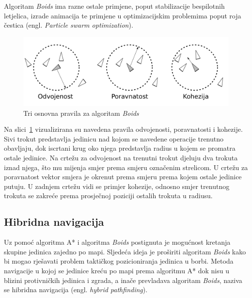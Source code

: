 \documentclass[times, utf8, zavrsni, numeric]{fer}
\begin{document}
\par Algoritam \textit{Boids} ima razne ostale primjene, poput stabilizacije bespilotnih letjelica, izrade animacija te primjene u optimizacijskim problemima poput roja čestica (engl. \textit{Particle swarm optimization}).

\begin{figure}[h]
	\centering
	\includegraphics[width=1.0\linewidth]{images/boids.pdf}
	\caption{Tri osnovna pravila za algoritam \textit{Boids}}
	\label{fig:boids}
\end{figure}

\par Na slici~\ref{fig:boids} vizualizirana su navedena pravila odvojenosti, poravnatosti i kohezije. 
Sivi trokut predstavlja jedinicu nad kojom se navedene operacije trenutno obavljaju, dok iscrtani krug oko njega predstavlja radius u kojem se promatra ostale jedinice. 
Na crtežu za odvojenost na trenutni trokut djeluju dva trokuta iznad njega, što mu mijenja smjer prema smjeru označenim strelicom. 
U crtežu za poravnatost vektor smjera je okrenut prema smjeru prema kojem ostale jedinice putuju. 
U zadnjem crtežu vidi se primjer kohezije, odnosno smjer trenutnog trokuta se zakreće prema prosječnoj poziciji ostalih trokuta u radiusu.

\subsection{Hibridna navigacija}\label{ssec:hybrid}

\par Uz pomoć algoritma A* i algoritma \textit{Boids} postignuta je mogućnost kretanja skupine jedinica zajedno po mapi.
Sljedeća ideja je proširiti algoritam \textit{Boids} kako bi mogao rješavati problem taktičkog pozicioniranja jedinica u borbi.
Metoda navigacije u kojoj se jedinice kreću po mapi prema algoritmu A* dok nisu u blizini protivničkih jedinica i zgrada, a inače prevladava algoritam \textit{Boids}, naziva se hibridna navigacija (engl. \textit{hybrid pathfinding})\cite{article:HybridPathdinding}.
\end{document}
